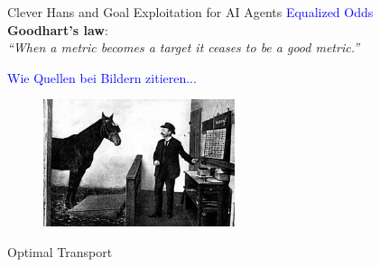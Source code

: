 \begin{vbframe}{Clever Hans and Goal Exploitation for AI Agents}
\textcolor{blue}{Equalized Odds}\\
\textbf{Goodhart's law}:\\

\textit{\enquote{When a metric becomes a target it ceases to be a good metric.}}


\textcolor{blue}{Wie Quellen bei Bildern zitieren...}
\begin{center}
\begin{figure}
\includegraphics[width=0.5\textwidth]{figure_man/fair-clever-hans.png}


\end{figure}
\end{center}

\framebreak
Optimal Transport

\end{vbframe}


\endlecture

